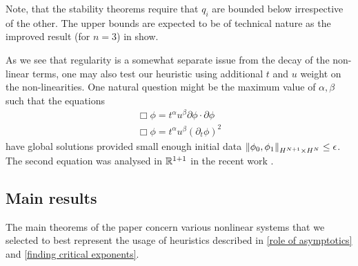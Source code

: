 \documentclass[11pt, oneside]{amsart}
\begin{document}
	Note, that the stability theorems require that $q_i$ are bounded below irrespective of the other. The upper bounds are expected to be of technical nature as the improved result (for $n=3$) in \cite{agemi_critical_2000} show.
	
	As we see that regularity is a somewhat separate issue from the decay of the non-linear terms, one may also test our heuristic using additional $t$ and $u$ weight on the non-linearities. One natural question might be the maximum value of $\alpha,\beta$ such that the equations
	\begin{equation*}
		\begin{gathered}
			\Box\phi=t^\alpha u^\beta \partial\phi\cdot\partial\phi\\
			\Box\phi=t^\alpha u^\beta (\partial_t\phi)^2
		\end{gathered}
	\end{equation*}
	have global solutions provided small enough initial data $\left\lVert \phi_0,\phi_1\right\rVert_{H^{N+1}\times H^N}\leq\epsilon$. The second equation was analysed in $\mathbb{R}^{1+1}$ in the recent work \cite{kitamura_semilinear_2022}.
	
	\subsection{Main results}\label{main results}
	The main theorems of the paper concern various nonlinear systems that we selected to best represent the usage of heuristics described in \cref{role of asymptotics} and \cref{finding critical exponents}.
		
\end{document}
